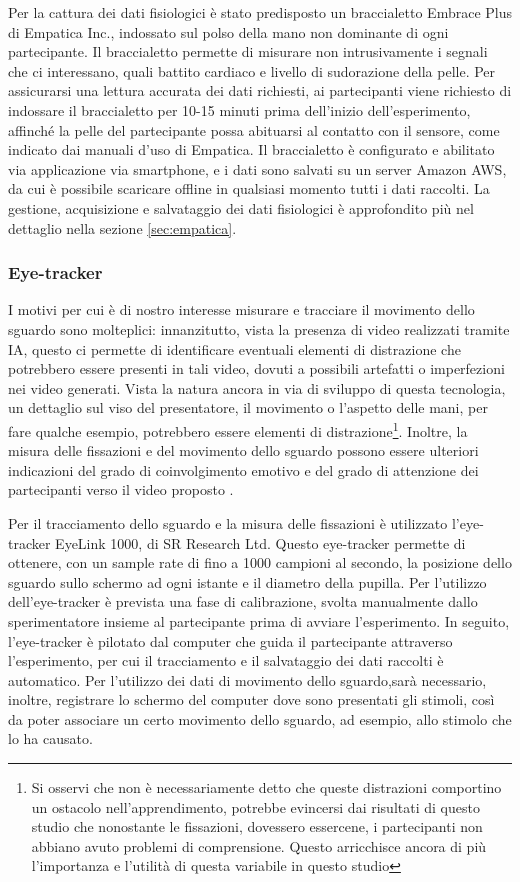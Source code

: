 Per la cattura dei dati fisiologici è stato predisposto un braccialetto Embrace Plus di Empatica Inc., indossato sul polso della mano non dominante di ogni partecipante. Il braccialetto permette di misurare non intrusivamente i segnali che ci interessano, quali battito cardiaco e livello di sudorazione della pelle. Per assicurarsi una lettura accurata dei dati richiesti, ai partecipanti viene richiesto di indossare il braccialetto per 10-15 minuti prima dell'inizio dell'esperimento, affinché la pelle del partecipante possa abituarsi al contatto con il sensore, come indicato dai manuali d'uso di Empatica. Il braccialetto è configurato e abilitato via applicazione via smartphone, e i dati sono salvati su un server Amazon AWS, da cui è possibile scaricare offline in qualsiasi momento tutti i dati raccolti. La gestione, acquisizione e salvataggio dei dati fisiologici è approfondito più nel dettaglio nella sezione \ref{sec:empatica}.

\subsubsection{Eye-tracker}

I motivi per cui è di nostro interesse misurare e tracciare il movimento dello sguardo sono molteplici: innanzitutto, vista la presenza di video realizzati tramite IA, questo ci permette di  identificare eventuali elementi di distrazione che potrebbero essere presenti in tali video, dovuti a possibili artefatti o imperfezioni nei video generati. Vista la natura ancora in via di sviluppo di questa tecnologia, un dettaglio sul viso del presentatore, il movimento o l'aspetto delle mani, per fare qualche esempio, potrebbero essere elementi di distrazione\footnote{Si osservi che non è necessariamente detto che queste distrazioni comportino un ostacolo nell'apprendimento, potrebbe evincersi dai risultati di questo studio che nonostante le fissazioni, dovessero essercene, i partecipanti non abbiano avuto problemi di comprensione. Questo arricchisce ancora di più l'importanza e l'utilità di questa variabile in questo studio}. Inoltre, la misura delle fissazioni e del movimento dello sguardo possono essere ulteriori indicazioni del grado di coinvolgimento emotivo e del grado di attenzione dei partecipanti verso il video proposto \cite{kar2020eyegazemooc}\cite{liu2019eyegazeemotion}. 

Per il tracciamento dello sguardo e la misura delle fissazioni è utilizzato l'eye-tracker EyeLink 1000, di SR Research Ltd. Questo eye-tracker permette di ottenere, con un sample rate di fino a 1000 campioni al secondo, la posizione dello sguardo sullo schermo ad ogni istante e il diametro della pupilla. Per l'utilizzo dell'eye-tracker è prevista una fase di calibrazione, svolta manualmente dallo sperimentatore insieme al partecipante prima di avviare l'esperimento. In seguito, l'eye-tracker è pilotato dal computer che guida il partecipante attraverso l'esperimento, per cui il tracciamento e il salvataggio dei dati raccolti è automatico. Per l'utilizzo dei dati di movimento dello sguardo,sarà necessario, inoltre, registrare lo schermo del computer dove sono presentati gli stimoli, così da poter associare un certo movimento dello sguardo, ad esempio, allo stimolo che lo ha causato.

